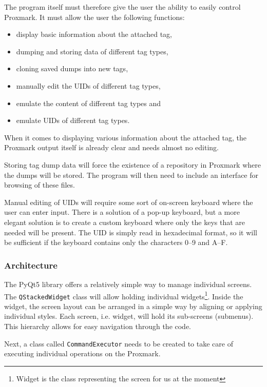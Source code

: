 The program itself must therefore give the user the ability to easily control Proxmark. It must allow the user the following functions:

\begin{itemize}
    \item display basic information about the attached tag,
    \item dumping and storing data of different tag types,
    \item cloning saved dumps into new tags,
    \item manually edit the UIDs of different tag types,
    \item emulate the content of different tag types and
    \item emulate UIDs of different tag types.
\end{itemize}

When it comes to displaying various information about the attached tag, the Proxmark output itself is already clear and needs almost no editing.

Storing tag dump data will force the existence of a repository in Proxmark where the dumps will be stored. The program will then need to include an interface for browsing of these files.

Manual editing of UIDs will require some sort of on-screen keyboard where the user can enter input. There is a solution of a pop-up keyboard, but a more elegant solution is to create a custom keyboard where only the keys that are needed will be present. The UID is simply read in hexadecimal format, so it will be sufficient if the keyboard contains only the characters 0--9 and A--F.

\subsubsection{Architecture}

The PyQt5 library offers a relatively simple way to manage individual screens. The \texttt{QStackedWidget} class will allow holding individual widgets\footnote{Widget is the class representing the screen for us at the moment}. Inside the widget, the screen layout can be arranged in a simple way by aligning or applying individual styles. Each screen, i.e. widget, will hold its sub-screens (submenus). This hierarchy allows for easy navigation through the code.

Next, a class called \texttt{CommandExecutor} needs to be created to take care of executing individual operations on the Proxmark.

